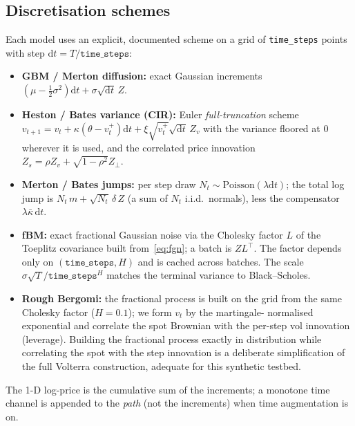 \documentclass[11pt]{article}
\newcommand{\code}[1]{\texttt{#1}}
\newcommand{\dd}{\mathrm{d}}
\begin{document}
\subsection{Discretisation schemes}
Each model uses an explicit, documented scheme on a grid of
\code{time\_steps} points with step $\dd t = T/\code{time\_steps}$:
\begin{itemize}
  \item \textbf{GBM / Merton diffusion:} exact Gaussian increments
        $(\mu-\tfrac12\sigma^2)\dd t + \sigma\sqrt{\dd t}\,Z$.
  \item \textbf{Heston / Bates variance (CIR):} Euler \emph{full-truncation}
        scheme~\cite{LordKoekkoekVanDijk2010,Andersen2008}
        $v_{t+1}=v_t+\kappa(\theta-v_t^{+})\dd t+\xi\sqrt{v_t^{+}}\sqrt{\dd t}\,Z_v$
        with the variance floored at $0$ wherever it is used, and the correlated
        price innovation $Z_s=\rho Z_v+\sqrt{1-\rho^2}Z_\perp$.
  \item \textbf{Merton / Bates jumps:} per step draw $N_t\sim\text{Poisson}(\lambda\dd t)$;
        the total log jump is $N_t\,m+\sqrt{N_t}\,\delta\,Z$ (a sum of $N_t$
        i.i.d.\ normals), less the compensator $\lambda\bar\kappa\,\dd t$.
  \item \textbf{fBM:} exact fractional Gaussian noise via the Cholesky factor $L$
        of the Toeplitz covariance built from~\eqref{eq:fgn}; a batch is
        $Z L^\top$. The factor depends only on $(\code{time\_steps},H)$ and is
        cached across batches. The scale $\sigma\sqrt{T}/\code{time\_steps}^{H}$
        matches the terminal variance to Black--Scholes.
  \item \textbf{Rough Bergomi:} the fractional process is built on the grid from
        the same Cholesky factor ($H=0.1$); we form $v_t$ by the martingale-
        normalised exponential and correlate the spot Brownian with the per-step
        vol innovation (leverage). Building the fractional process exactly in
        distribution while correlating the spot with the step innovation is a
        deliberate simplification of the full Volterra construction, adequate for
        this synthetic testbed.
\end{itemize}
The 1-D log-price is the cumulative sum of the increments; a monotone time channel
is appended to the \emph{path} (not the increments) when time augmentation is on.
\end{document}
